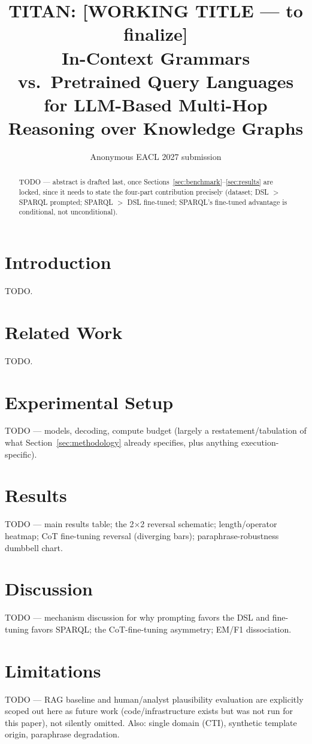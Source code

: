 \documentclass[11pt]{article}
\title{TITAN: [WORKING TITLE --- to finalize] \\
  In-Context Grammars vs.\ Pretrained Query Languages \\
  for LLM-Based Multi-Hop Reasoning over Knowledge Graphs}
\author{Anonymous EACL 2027 submission}
\begin{document}
\maketitle

\begin{abstract}
TODO --- abstract is drafted last, once Sections~\ref{sec:benchmark}--\ref{sec:results} are locked, since it needs to state the four-part contribution precisely (dataset; DSL $>$ SPARQL prompted; SPARQL $>$ DSL fine-tuned; SPARQL's fine-tuned advantage is conditional, not unconditional).
\end{abstract}

\section{Introduction}
\label{sec:intro}
TODO.

\section{Related Work}
\label{sec:related}
TODO.





\section{Experimental Setup}
\label{sec:expsetup}
TODO --- models, decoding, compute budget (largely a restatement/tabulation of what Section~\ref{sec:methodology} already specifies, plus anything execution-specific).

\section{Results}
\label{sec:results}
TODO --- main results table; the 2$\times$2 reversal schematic; length/operator heatmap; CoT fine-tuning reversal (diverging bars); paraphrase-robustness dumbbell chart.

\section{Discussion}
\label{sec:discussion}
TODO --- mechanism discussion for why prompting favors the DSL and fine-tuning favors SPARQL; the CoT-fine-tuning asymmetry; EM/F1 dissociation.

\section{Limitations}
\label{sec:limitations}
TODO --- RAG baseline and human/analyst plausibility evaluation are explicitly scoped out here as future work (code/infrastructure exists but was not run for this paper), not silently omitted. Also: single domain (CTI), synthetic template origin, paraphrase degradation.
\end{document}

